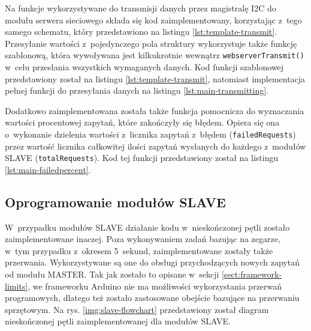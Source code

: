 

\FloatBarrier
Na funkcje wykorzystywane do transmisji danych przez magistralę I2C do modułu serwera sieciowego składa się kod
zaimplementowany, korzystając z~tego samego schematu, który przedstawiono na listingu \ref{lst:template-transmit}.
Przesyłanie wartości z~pojedynczego pola struktury wykorzystuje także funkcję szablonową, która wywoływana jest
kilkukrotnie wewnątrz \texttt{webserverTransmit()} w~celu przesłania wszystkich wymaganych danych. Kod funkcji
szablonowej przedstawiony został na listingu \ref{lst:template-transmit}, natomiast implementacja pełnej funkcji do
przesyłania danych na listingu \ref{lst:main-transmitting}.





\FloatBarrier
Dodatkowo zaimplementowana została także funkcja pomocnicza
do wyznaczania wartości procentowej zapytań, które zakończyły się błędem. Opiera się ona o~wykonanie dzielenia wartości
z~licznika zapytań z~błędem (\texttt{failedRequests}) przez wartość licznika całkowitej ilości zapytań wysłanych do
każdego z~modułów SLAVE (\texttt{totalRequests}). Kod tej funkcji przedstawiony został na listingu
\ref{lst:main-failedpercent}.



\FloatBarrier
\subsection{Oprogramowanie modułów SLAVE\label{sect:firmware-slave}} W~przypadku modułów SLAVE działanie kodu
w~nieskończonej pętli zostało zaimplementowane inaczej. Poza wykonywaniem zadań bazując na zegarze, w~tym przypadku
z~okresem 5~sekund, zaimplementowane zostały także przerwania. Wykorzystywane są one do obsługi przychodzących nowych
zapytań od modułu MASTER. Tak jak zostało to opisane w~sekcji \ref{sect:framework-limits}, we frameworku Arduino nie ma
możliwości wykorzystania przerwań programowych, dlatego też zostało zastosowane obejście bazujące na przerwaniu
sprzętowym. Na rys. \ref{img:slave-flowchart} przedstawiony został diagram nieskończonej pętli zaimplementowanej dla
modułów SLAVE.

